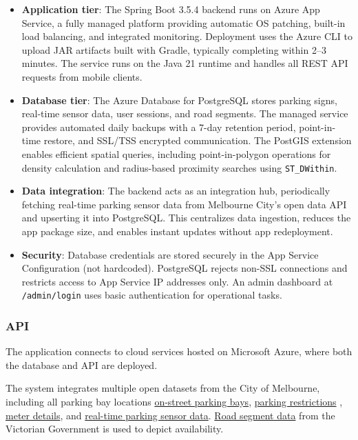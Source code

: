 \begin{itemize}
    \item \textbf{Application tier}: The Spring Boot 3.5.4 backend runs on Azure App Service, a fully managed platform providing automatic OS patching, built-in load balancing, and integrated monitoring. Deployment uses the Azure CLI to upload JAR artifacts built with Gradle, typically completing within 2--3 minutes. The service runs on the Java 21 runtime and handles all REST API requests from mobile clients.

\item \textbf{Database tier}: The Azure Database for PostgreSQL stores parking signs, real-time sensor data, user sessions, and road segments. The managed service provides automated daily backups with a 7-day retention period, point-in-time restore, and SSL/TSS encrypted communication. The PostGIS extension enables efficient spatial queries, including point-in-polygon operations for density calculation and radius-based proximity searches using \texttt{ST\_DWithin}.
\item \textbf{Data integration}:
The backend acts as an integration hub, periodically fetching real-time parking sensor data from Melbourne City's open data API and upserting it into PostgreSQL. This centralizes data ingestion, reduces the app package size, and enables instant updates without app redeployment.
\item \textbf{Security}: Database credentials are stored securely in the App Service Configuration (not hardcoded). PostgreSQL rejects non-SSL connections and restricts access to App Service IP addresses only. An admin dashboard at \texttt{/admin/login} uses basic authentication for operational tasks.
\end{itemize}

\subsubsection{API}

The application connects to cloud services hosted on Microsoft Azure, where both the database and API are deployed.

The system integrates multiple open datasets from the City of Melbourne, including all parking bay locations \href{https://data.melbourne.vic.gov.au/explore/dataset/on-street-parking-bays/information/}{on-street parking bays}, \href{https://data.melbourne.vic.gov.au/explore/dataset/pay-stay-parking-restrictions/information/}{parking restrictions} , \href{https://data.melbourne.vic.gov.au/explore/dataset/pay-stay-zones-linked-to-street-segments/information/}{meter details}, and \href{https://data.melbourne.vic.gov.au/explore/dataset/on-street-parking-bay-sensors/information/}{real-time parking sensor data}. \href{https://discover.data.vic.gov.au/dataset/road-segment}{Road segment data} from the Victorian Government is used to depict availability.

